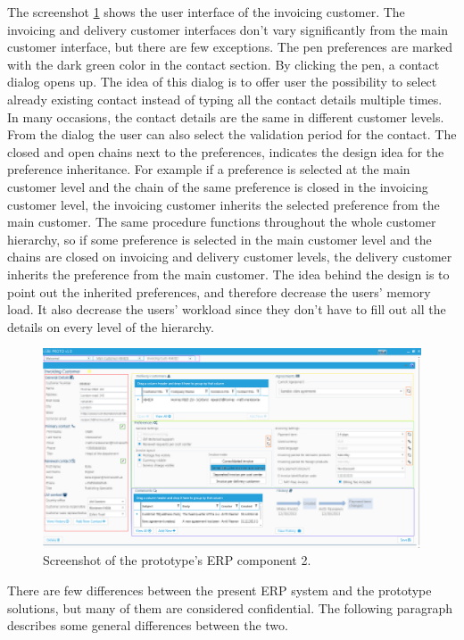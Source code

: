 \documentclass[12pt,a4paper,oneside,pdftex]{report}
\begin{document}
The screenshot \ref{fig:prototwoimg} shows the user interface of the invoicing customer. The invoicing and delivery customer interfaces don't vary significantly from the main customer interface, but there are few exceptions. The pen preferences are marked with the dark green color in the contact section. By clicking the pen, a contact dialog opens up. The idea of this dialog is to offer user the possibility to select already existing contact instead of typing all the contact details multiple times. In many occasions, the contact details are the same in different customer levels. From the dialog the user can also select the validation period for the contact. The closed and open chains next to the preferences, indicates the design idea for the preference inheritance. For example if a preference is selected at the main customer level and the chain of the same preference is closed in the invoicing customer level, the invoicing customer inherits the selected preference from the main customer. The same procedure functions throughout the whole customer hierarchy, so if some preference is selected in the main customer level and the chains are closed on invoicing and delivery customer levels, the delivery customer inherits the preference from the main customer. The idea behind the design is to point out the inherited preferences, and therefore decrease the users' memory load. It also decrease the users' workload since they don't have to fill out all the details on every level of the hierarchy.   

\begin{figure}[H]
  	\centerline{
    	   \includegraphics[width=1.4\textwidth]{./images/proto_invoicing.png}
    	   }
  	   \caption{Screenshot of  the prototype's ERP component 2.}
	   \label{fig:prototwoimg}
\end{figure}

There are few differences between the present ERP system and the prototype solutions, but many of them are considered confidential. The following paragraph describes some general differences between the two.
\end{document}
